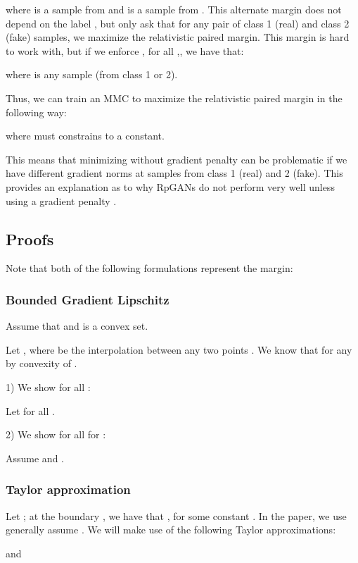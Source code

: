 \documentclass{article}
\begin{document}
where  is a sample from  and  is a sample from . This alternate margin does not depend on the label , but only ask that for any pair of class 1 (real) and class 2 (fake) samples, we maximize the relativistic paired margin. This margin is hard to work with, but if we enforce , for all ,, we have that:

where  is any sample (from class 1 or 2).

Thus, we can train an MMC to maximize the relativistic paired margin in the following way:

where  must constrains  to a constant.

This means that minimizing  without gradient penalty can be problematic if we have different gradient norms at samples from class 1 (real) and 2 (fake). This provides an explanation as to why RpGANs do not perform very well unless using a gradient penalty \citep{jolicoeur2018relativistic}.

\subsection{Proofs}

Note that both of the following formulations represent the margin:



\subsubsection{Bounded Gradient  Lipschitz }

Assume that  and  is a convex set.

Let , where  be the interpolation between any two points . We know that  for any  by convexity of .


1) We show  for all :

Let  for all .


2) We show  for all   for :

Assume  and .


\subsubsection{Taylor approximation}

Let ; at the boundary , we have that , for some constant . In the paper, we use generally assume . We will make use of the following Taylor approximations:



and 
\end{document}
